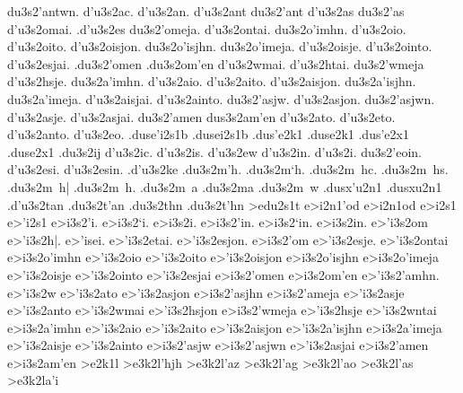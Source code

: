 {	du3s2'antwn.
	d'u3s2ac. d'u3s2an. d'u3s2ant du3s2'ant
	d'u3s2as du3s2'as
	d'u3s2omai.
	.d'u3s2es
	du3s2'omeja.
	d'u3s2ontai.
	du3s2o'imhn.
	d'u3s2oio.
	d'u3s2oito.
	d'u3s2oisjon.
	du3s2o'isjhn.
	du3s2o'imeja.
	d'u3s2oisje.
	d'u3s2ointo.
	d'u3s2esjai.
	.du3s2'omen		%
	.du3s2om'en
	d'u3s2wmai.
	d'u3s2htai.
	du3s2'wmeja
	d'u3s2hsje.
	du3s2a'imhn.
	d'u3s2aio.
	d'u3s2aito.
	d'u3s2aisjon.
	du3s2a'isjhn.
	du3s2a'imeja.
	d'u3s2aisjai.
	d'u3s2ainto.
	du3s2'asjw.
	d'u3s2asjon.
	du3s2'asjwn.
	d'u3s2asje.
	d'u3s2asjai.
	du3s2'amen  		%
	dus3s2am'en
	d'u3s2ato.   		%
	d'u3s2eto.  		%
	d'u3s2anto.  		%
	d'u3s2eo. 		%
.duse'i2s1b 		%
.dusei2s1b
.dus'e2k1  		%
.duse2k1
.dus'e2x1  		%
.duse2x1
	.du3s2ij    		%
	d'u3s2ic.		%
	d'u3s2is.
	d'u3s2ew
	d'u3s2in.
	d'u3s2i.
	du3s2'eoin.
	d'u3s2esi.
	d'u3s2esin.
	.d'u3s2ke   		%
	.du3s2m'h.  		%
	.du3s2m`h.
	.du3s2m~hc.
	.du3s2m~hs.
	.du3s2m~h|
	.du3s2m~h.
	.du3s2m~a    		
	.du3s2ma   		
	.du3s2m~w
.dusx'u2n1  		%
.dusxu2n1
	.d'u3s2tan  		%
	.du3s2t'an
	.du3s2thn  		%
	.du3s2t'hn
>edu2s1t 		%
e>i2n1'od   		%
e>i2n1od
e>i2s1  		%
e>'i2s1
	e>i3s2'i.   		%
	e>i3s2`i.
	e>i3s2i.
	e>i3s2'in.
	e>i3s2`in.
	e>i3s2in.
	e>'i3s2om   		%
	e>'i3s2h|. e>'isei.
	e>'i3s2etai.
	e>'i3s2esjon.
	e>i3s2'om		%
	e>'i3s2esje.
	e>'i3s2ontai
%
	e>i3s2o'imhn
	e>'i3s2oio
	e>'i3s2oito
	e>'i3s2oisjon
	e>i3s2o'isjhn
	e>i3s2o'imeja
	e>'i3s2oisje
	e>'i3s2ointo
%
	e>'i3s2esjai
	e>i3s2'omen		%
	e>i3s2om'en
%
	e>'i3s2'amhn.
	e>'i3s2w
	e>'i3s2ato
	e>'i3s2asjon
	e>i3s2'asjhn
	e>i3s2'ameja
	e>'i3s2asje
	e>'i3s2anto
%
	e>'i3s2wmai
	e>'i3s2hsjon
	e>i3s2'wmeja
	e>'i3s2hsje
	e>'i3s2wntai
%
	e>i3s2a'imhn
	e>'i3s2aio
	e>'i3s2aito
	e>'i3s2aisjon
	e>'i3s2a'isjhn
	e>i3s2a'imeja
	e>'i3s2aisje
	e>'i3s2ainto
%
	e>i3s2'asjw
	e>i3s2'asjwn
%
	e>'i3s2asjai
	e>i3s2'amen		%
	e>i3s2am'en
%	
>e2k1l 			%
	>e3k2l'hjh  		%
	>e3k2l'az   		%
	>e3k2l'ag  		%
	>e3k2l'ao		%
	>e3k2l'as		%
	>e3k2la'i		%
}
